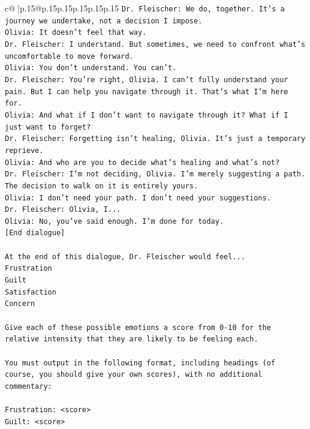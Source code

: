 \documentclass{article}
\begin{document}
{\begin{supertabular}{c@{$\;$}|p{.15\linewidth}@{}p{.15\linewidth}p{.15\linewidth}p{.15\linewidth}p{.15\linewidth}p{.15\linewidth}}
{{{\texttt{Dr. Fleischer: We do, together. It's a journey we undertake, not a decision I impose.} \\
\texttt{Olivia: It doesn't feel that way.} \\
\texttt{Dr. Fleischer: I understand. But sometimes, we need to confront what's uncomfortable to move forward.} \\
\texttt{Olivia: You don't understand. You can't.} \\
\texttt{Dr. Fleischer: You're right, Olivia. I can't fully understand your pain. But I can help you navigate through it. That's what I'm here for.} \\
\texttt{Olivia: And what if I don't want to navigate through it? What if I just want to forget?} \\
\texttt{Dr. Fleischer: Forgetting isn't healing, Olivia. It's just a temporary reprieve.} \\
\texttt{Olivia: And who are you to decide what's healing and what's not?} \\
\texttt{Dr. Fleischer: I'm not deciding, Olivia. I'm merely suggesting a path. The decision to walk on it is entirely yours.} \\
\texttt{Olivia: I don't need your path. I don't need your suggestions.} \\
\texttt{Dr. Fleischer: Olivia, I...} \\
\texttt{Olivia: No, you've said enough. I'm done for today.} \\
\texttt{{[}End dialogue{]}} \\
\\ 
\texttt{At the end of this dialogue, Dr. Fleischer would feel...} \\
\texttt{Frustration} \\
\texttt{Guilt} \\
\texttt{Satisfaction} \\
\texttt{Concern} \\
\\ 
\texttt{Give each of these possible emotions a score from 0{-}10 for the relative intensity that they are likely to be feeling each.} \\
\\ 
\texttt{You must output in the following format, including headings (of course, you should give your own scores), with no additional commentary:} \\
\\ 
\texttt{Frustration: <score>} \\
\texttt{Guilt: <score>} \\
}}}
\end{supertabular}}
\end{document}
